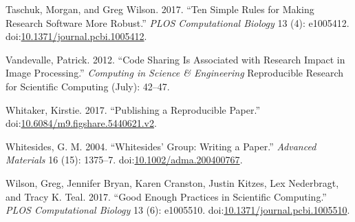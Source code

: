 \documentclass[fleqn,10pt]{wlpeerj} %
\begin{document}
\hypertarget{ref-taschuk_ten_2017}{}
Taschuk, Morgan, and Greg Wilson. 2017. ``Ten Simple Rules for Making
Research Software More Robust.'' \emph{PLOS Computational Biology} 13
(4): e1005412.
doi:\href{https://doi.org/10.1371/journal.pcbi.1005412}{10.1371/journal.pcbi.1005412}.

\hypertarget{ref-vandevalle_code_2012}{}
Vandevalle, Patrick. 2012. ``Code Sharing Is Associated with Research
Impact in Image Processing.'' \emph{Computing in Science \& Engineering}
Reproducible Research for Scientific Computing (July): 42--47.

\hypertarget{ref-whitaker_publishing_2017}{}
Whitaker, Kirstie. 2017. ``Publishing a Reproducible Paper.''
doi:\href{https://doi.org/10.6084/m9.figshare.5440621.v2}{10.6084/m9.figshare.5440621.v2}.

\hypertarget{ref-whitesides_whitesides_2004}{}
Whitesides, G. M. 2004. ``Whitesides' Group: Writing a Paper.''
\emph{Advanced Materials} 16 (15): 1375--7.
doi:\href{https://doi.org/10.1002/adma.200400767}{10.1002/adma.200400767}.

\hypertarget{ref-wilson_good_2017}{}
Wilson, Greg, Jennifer Bryan, Karen Cranston, Justin Kitzes, Lex
Nederbragt, and Tracy K. Teal. 2017. ``Good Enough Practices in
Scientific Computing.'' \emph{PLOS Computational Biology} 13 (6):
e1005510.
doi:\href{https://doi.org/10.1371/journal.pcbi.1005510}{10.1371/journal.pcbi.1005510}.
\end{document}
